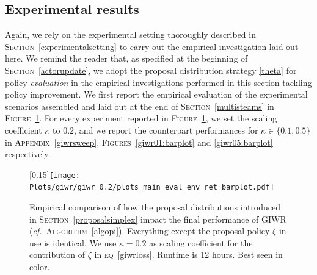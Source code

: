\DecMargin{1em}

\subsection{Experimental results}
\label{piresults}

Again, we rely on the experimental setting thoroughly described in \textsc{Section}~\ref{experimentalsetting}
to carry out the empirical investigation laid out here.
We remind the reader that, as specified at the beginning of \textsc{Section}~\ref{actorupdate},
we adopt the proposal distribution strategy \ref{theta} for policy \emph{evaluation} in the empirical investigations
performed in this section tackling policy improvement.
We first report the empirical evaluation of the experimental scenarios assembled and
laid out at the end of \textsc{Section}~\ref{multisteams}
in \textsc{Figure}~\ref{giwr02:barplot}.
For every experiment reported in \textsc{Figure}~\ref{giwr02:barplot}, we set the scaling coefficient
$\kappa$ to $0.2$, and we report the counterpart performances for $\kappa \in \{0.1, 0.5\}$ in
\textsc{Appendix}~\ref{giwrsweep}, \textsc{Figures}~\ref{giwr01:barplot} and \ref{giwr05:barplot} respectively.

\begin{figure}[!h]
  \center\scalebox{0.15}[0.15]{\texttt{[image: Plots/giwr/giwr\_0.2/plots\_main\_eval\_env\_ret\_barplot.pdf]}}
  \caption{Empirical comparison of how the proposal distributions introduced
  in \textsc{Section}~\ref{proposalsimplex}
  impact the final performance of GIWR (\textit{cf.}~\textsc{Algorithm}~\ref{algopi}).
  Everything except the proposal policy $\zeta$ in use is identical.
  We use $\kappa=0.2$ as scaling coefficient for the contribution of $\zeta$
  in \textsc{eq}~\ref{giwrloss}.
  Runtime is 12 hours. Best seen in color.}
  \label{giwr02:barplot}
\end{figure}

